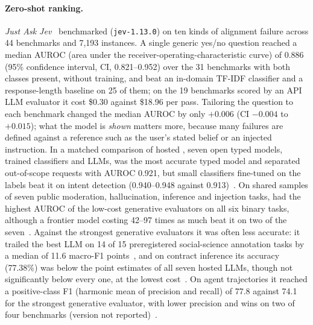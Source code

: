 \paragraph{Zero-shot ranking.}
\emph{Just Ask Jev}~\cite{arx29429} benchmarked \jev{} (\texttt{jev-1.13.0}) on ten kinds of alignment failure across 44 benchmarks and 7{,}193 instances.
A single generic yes/no question reached a median AUROC (area under the receiver-operating-characteristic curve) of 0.886 (95\% confidence interval, CI, 0.821--0.952) over the 31 benchmarks with both classes present, without training, and beat an in-domain TF-IDF classifier and a response-length baseline on 25 of them; on the 19 benchmarks scored by an API LLM evaluator it cost \$0.30 against \$18.96 per pass.
Tailoring the question to each benchmark changed the median AUROC by only $+0.006$ (CI $-0.004$ to $+0.015$); what the model is \emph{shown} matters more, because many failures are defined against a reference such as the user's stated belief or an injected instruction.
In a matched comparison of hosted \jev{}, seven open typed models, trained classifiers and LLMs, \jev{} was the most accurate typed model and separated out-of-scope requests with AUROC 0.921, but small classifiers fine-tuned on the labels beat it on intent detection (0.940--0.948 against 0.913)~\cite{arx00346}.
On shared samples of seven public moderation, hallucination, inference and injection tasks, \jev{} had the highest AUROC of the low-cost generative evaluators on all six binary tasks, although a frontier model costing 42--97 times as much beat it on two of the seven~\cite{zen22885291}\zmark{}. Against the strongest generative evaluators it was often less accurate: it trailed the best LLM on 14 of 15 preregistered social-science annotation tasks by a median of 11.6 macro-F1 points~\cite{arx24574}, and on contract inference its accuracy (77.38\%) was below the point estimates of all seven hosted LLMs, though not significantly below every one, at the lowest cost~\cite{arx27678}. On agent trajectories it reached a positive-class F1 (harmonic mean of precision and recall) of 77.8 against 74.1 for the strongest generative evaluator, with lower precision and wins on two of four benchmarks (version not reported)~\cite{arx34862}.

